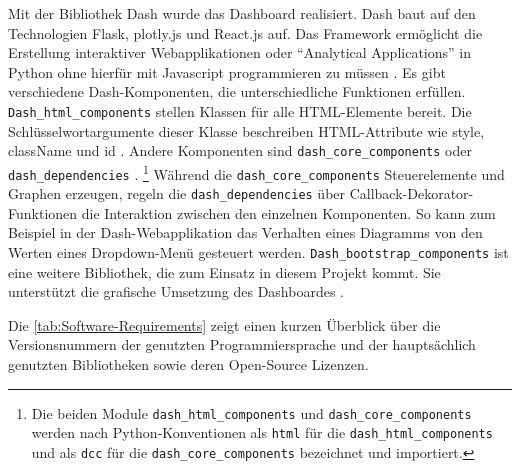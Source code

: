     Mit der Bibliothek Dash wurde das Dashboard realisiert. Dash baut auf den Technologien Flask, plotly.js und React.js auf. Das Framework ermöglicht die Erstellung interaktiver Webapplikationen 
    oder \enquote{Analytical Applications} in Python ohne hierfür mit Javascript programmieren zu müssen \cite[vgl.][]{plotly_dash_2021}.
    Es gibt verschiedene Dash-Komponenten, die unterschiedliche Funktionen erfüllen. \texttt{Dash\_html\_components} stellen Klassen für alle HTML-Elemente bereit.
    Die Schlüsselwortargumente dieser Klasse beschreiben HTML-Attribute wie style, className und id \cite[vgl.][]{plotly_dash_2021-2}. 
    Andere Komponenten sind \texttt{dash\_core\_components} oder \texttt{dash\_dependencies} \cite[vgl.][]{plotly_dash_2021-1}.
    \footnote{ Die beiden Module \texttt{dash\_html\_components} und \texttt{dash\_core\_components} werden nach Python-Konventionen als \texttt{html} für die \texttt{dash\_html\_components} und als \texttt{dcc} für die \texttt{dash\_core\_components} bezeichnet und importiert.}
    Während die \texttt{dash\_core\_components}
    Steuerelemente und Graphen erzeugen, regeln die \texttt{dash\_dependencies} über Callback-Dekorator-Funktionen die Interaktion zwischen den einzelnen Komponenten.
    So kann zum Beispiel in der Dash-Webapplikation das Verhalten eines Diagramms von den Werten eines Dropdown-Menü gesteuert werden. 
    \texttt{Dash\_bootstrap\_components} ist eine weitere Bibliothek, die zum Einsatz in diesem Projekt kommt. Sie unterstützt die grafische Umsetzung
    des Dashboardes \cite[vgl.][]{faculty_dash_2021}.

    Die \autoref{tab:Software-Requirements} zeigt einen kurzen Überblick über die Versionsnummern der genutzten Programmiersprache und der hauptsächlich 
    genutzten Bibliotheken sowie deren Open-Source Lizenzen.
    
